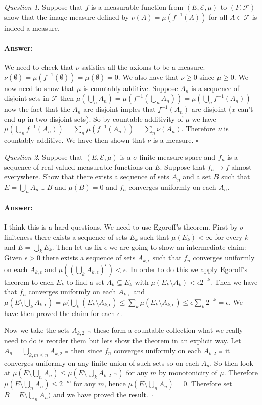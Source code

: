 \documentclass[11pt]{article}
\theoremstyle{definition}
\theoremstyle{remark}
\newtheorem{q}{Question}
\newenvironment{ans}{\paragraph{Answer:}}{\hfill$\square$ \vspace{10pt}}
\begin{document}
\begin{q}
Suppose that $f$ is a measurable function from $(E, \mathcal{E}, \mu)$ to $(F, \mathcal{F})$ show that the image measure defined by $\nu(A) = \mu(f^{-1}(A))$ for all $A \in \mathcal{F}$ is indeed a measure.
\end{q}
\begin{ans}
We need to check that $\nu$ satisfies all the axioms to be a measure. $\nu(\emptyset) = \mu(f^{-1}(\emptyset)) = \mu(\emptyset) = 0$. We also have that $\nu \geq 0$ since $\mu \geq 0$. We now need to show that $\mu$ is countably additive. Suppose $A_n$ is a sequence of disjoint sets in $\mathcal{F}$ then $\mu(\bigcup_n A_n) = \mu(f^{-1}(\bigcup_n A_n)) = \mu ( \bigcup_n f^{-1}(A_n))$ now the fact that the $A_n$ are disjoint imples that $f^{-1}(A_n)$ are disjoint ($x$ can't end up in two disjoint sets). So by countable additivity of $\mu$ we have $\mu( \bigcup_n f^{-1}(A_n))= \sum_n \mu(f^{-1}(A_n)) = \sum_n \nu (A_n)$. Therefore $\nu$ is countably additive. We have then shown that $\nu$ is a measure.
\end{ans}

\begin{q}
Suppose that $(E, \mathcal{E}, \mu)$ is a $\sigma$-finite measure space and $f_n$ is a sequence of real valued measurable functions on $E$. Suppose that $f_n \rightarrow f$ almost everywhere. Show that there exists a sequence of sets $A_n$ and a set $B$ such that $E = \bigcup_n A_n \cup B$ and $\mu(B) =0$ and $f_n$ converges uniformly on each $A_n$.
\end{q}
\begin{ans}
I think this is a hard questions. We need to use Egoroff's theorem. First by $\sigma$-finiteness there exists a sequence of sets $E_k$ such that $\mu(E_k) < \infty$ for every $k$ and $E= \bigcup_k E_k$. Then let us fix $\epsilon$ we are going to show an intermediate claim: Given $\epsilon >0$ there exists a sequence of sets $A_{k, \epsilon}$ such that $f_n$ converges uniformly on each $A_{k,\epsilon}$ and $\mu((\bigcup_k A_{k, \epsilon})^c) < \epsilon$. In order to do this we apply Egoroff's theorem to each $E_k$ to find a set $A_k \subseteq E_k$ with $\mu(E_k \setminus A_k) < \epsilon 2^{-k}$. Then we have that $f_n$ converges uniformly on each $A_{k, \epsilon}$ and $\mu(E \setminus \bigcup_k A_{k,\epsilon}) = \mu( \bigcup_k (E_k \setminus A_{k, \epsilon}) \leq \sum_k \mu(E_k \setminus A_{k,\epsilon}) \leq \epsilon \sum_k 2^{-k} = \epsilon$. We have then proved the claim for each $\epsilon$.

Now we take the sets $A_{k, 2^{-m}}$ these form a countable collection what we really need to do is reorder them but lets show the theorem in an explicit way. Let $A_{n} = \bigcup_{k, m \leq n} A_{k, 2^{-m}}$ then since $f_n$ converges uniformly on each $A_{k, 2^{-m}}$ it converges uniformly on any finite union of such sets so on each $A_n$. So then look at $\mu(E \setminus \bigcup_n A_n) \leq \mu(E \setminus \bigcup_k A_{k, 2^{-m}})$ for any $m$ by monotonicity of $\mu$. Therefore $\mu(E \setminus \bigcup_n A_n) \leq 2^{-m}$ for any $m$, hence $\mu(E \setminus \bigcup_n A_n) = 0$. Therefore set $B = E \setminus \bigcup_n A_n)$ and we have proved the result.
\end{ans}
\end{document}
